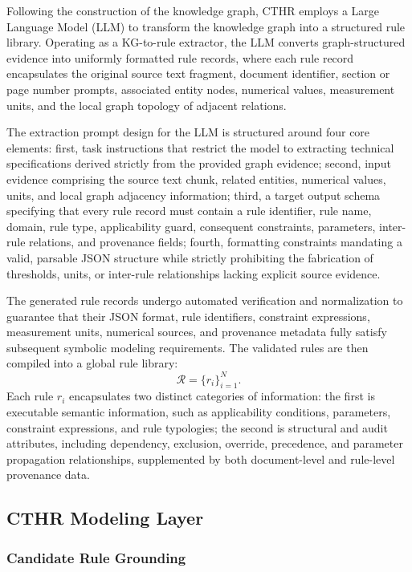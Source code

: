 ﻿\documentclass[a4paper,fleqn]{cas-dc}
\begin{document}
Following the construction of the knowledge graph, CTHR employs a Large Language Model (LLM) to transform the knowledge graph into a structured rule library. Operating as a KG-to-rule extractor, the LLM converts graph-structured evidence into uniformly formatted rule records, where each rule record encapsulates the original source text fragment, document identifier, section or page number prompts, associated entity nodes, numerical values, measurement units, and the local graph topology of adjacent relations.

The extraction prompt design for the LLM is structured around four core elements: first, task instructions that restrict the model to extracting technical specifications derived strictly from the provided graph evidence; second, input evidence comprising the source text chunk, related entities, numerical values, units, and local graph adjacency information; third, a target output schema specifying that every rule record must contain a rule identifier, rule name, domain, rule type, applicability guard, consequent constraints, parameters, inter-rule relations, and provenance fields; fourth, formatting constraints mandating a valid, parsable JSON structure while strictly prohibiting the fabrication of thresholds, units, or inter-rule relationships lacking explicit source evidence.

The generated rule records undergo automated verification and normalization to guarantee that their JSON format, rule identifiers, constraint expressions, measurement units, numerical sources, and provenance metadata fully satisfy subsequent symbolic modeling requirements. The validated rules are then compiled into a global rule library:
\begin{equation}
\mathcal{R}=\{r_i\}_{i=1}^{N}.
\end{equation}
Each rule $r_i$ encapsulates two distinct categories of information: the first is executable semantic information, such as applicability conditions, parameters, constraint expressions, and rule typologies; the second is structural and audit attributes, including dependency, exclusion, override, precedence, and parameter propagation relationships, supplemented by both document-level and rule-level provenance data.

\subsection{CTHR Modeling Layer}
\label{sec:cthr_modeling_layer}

\subsubsection{Candidate Rule Grounding}
\label{sec:candidate_grounding}
\end{document}
